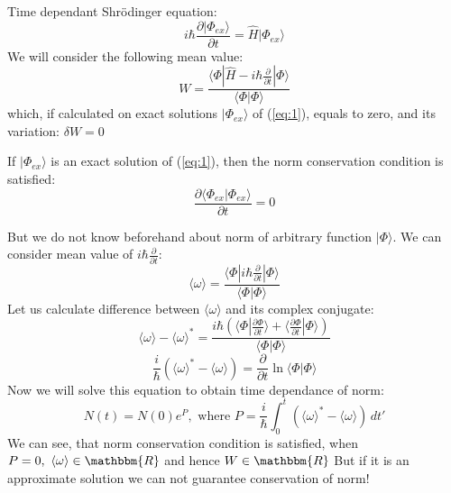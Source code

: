 Time dependant Shr\"{o}dinger equation:
\begin{equation}
i\hbar\frac{\partial |\Phi_{ex}\rangle}{\partial t} = \hat{H}|\Phi_{ex}\rangle
\label{eq:1}
\end{equation}
We will consider the following mean value:
$$W=\frac{ \langle \Phi| \hat{H} - i\hbar\frac{\partial}{\partial t} | \Phi \rangle }{\langle\Phi|\Phi\rangle}$$
which, if calculated on exact solutions $|\Phi_{ex}\rangle$ of (\ref{eq:1}), equals to zero, and its variation: $\delta W = 0$

If $|\Phi_{ex}\rangle$ is an exact solution of (\ref{eq:1}), then the norm conservation condition is satisfied:
$$\frac{\partial \langle\Phi_{ex}|\Phi_{ex}\rangle }{\partial t} = 0$$

But we do not know beforehand about norm of arbitrary function $|\Phi\rangle$.
We can consider mean value of $i\hbar\frac{\partial}{\partial t}$:
$$\langle\omega\rangle = \frac{ \langle \Phi | i\hbar\frac{\partial}{\partial t} | \Phi \rangle }{\langle\Phi|\Phi\rangle}$$
Let us calculate difference between $\langle\omega\rangle$ and its complex conjugate:
$$\langle\omega\rangle-\langle\omega\rangle^* = \frac{i\hbar( \langle\Phi|\frac{\partial \Phi}{\partial t}\rangle + %
							      \langle\frac{\partial \Phi}{\partial t}|\Phi\rangle )}%
						     {\langle\Phi|\Phi\rangle}$$
$$\frac{i}{\hbar}\left(\langle\omega\rangle^*-\langle\omega\rangle\right) = \frac{\partial}{\partial t}\ln\langle\Phi|\Phi\rangle$$
Now we will solve this equation to obtain time dependance of norm:
$$N(t) = N(0)e^P,\text{ where } P = \frac{i}{\hbar}\int_0^t\left(\langle\omega\rangle^*-\langle\omega\rangle\right)\,dt'$$
We can see, that norm conservation condition is satisfied, when $P=0,\ \langle\omega\rangle\in\mathbbm{R}$ and hence $W\in\mathbbm{R}$
But if it is an approximate solution we can not guarantee conservation of norm!

